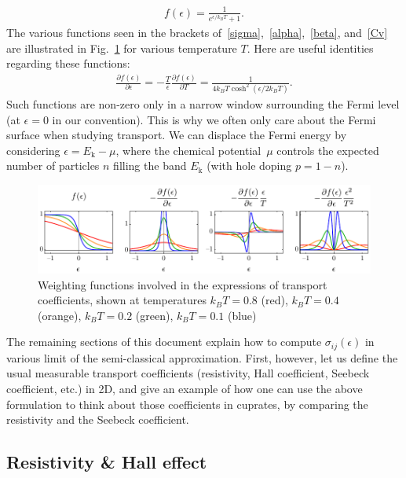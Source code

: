 \documentclass[notitlepage,11pt,nofootinbib]{revtex4-1}
\renewcommand{\vec}[1]{\bm{\mathrm{#1}}}
\begin{document}
\begin{align}
f(\epsilon) = \frac{1}{e^{\epsilon/k_{B}T}+1}.
\end{align}
The various functions seen in the brackets of~\eqref{sigma},~\eqref{alpha},~\eqref{beta}, and~\eqref{Cv} are illustrated in Fig.~\ref{figure_fermi} for various temperature $T$. Here are useful identities regarding these functions:
\begin{align}
\frac{\partial f(\epsilon)}{\partial \epsilon}
= 
-\frac{T}{\epsilon}
\frac{\partial f(\epsilon)}{\partial T} = 
\frac{1}{4k_BT\cosh^{2}(\epsilon/2k_BT)}.
\end{align}
Such functions are non-zero only in a narrow window surrounding the Fermi level (at $\epsilon=0$ in our convention). This is why we often only care about the Fermi surface when studying transport. 
We can displace the Fermi energy by considering $\epsilon = E_{\vec k}-\mu$, where the chemical potential~$\mu$ controls the expected number of particles $n$ filling the band $E_{\vec k}$ (with hole doping $p=1-n$).

\begin{figure}
\centering
\includegraphics[width=\textwidth]{fermi.pdf}
\caption{Weighting functions involved in the expressions of transport coefficients, shown at temperatures $k_BT=0.8$ (red), $k_BT=0.4$ (orange), $k_BT=0.2$ (green), $k_BT=0.1$ (blue)}
\label{figure_fermi}
\end{figure}

The remaining sections of this document explain how to compute $\sigma_{ij}(\epsilon)$ in various limit of the semi-classical approximation. 
First, however, let us define the usual measurable transport coefficients (resistivity, Hall coefficient, Seebeck coefficient, etc.) in 2D, and give an example of how one can use the above formulation to think about those coefficients in cuprates, by comparing the resistivity and the Seebeck coefficient.

\subsection{Resistivity \& Hall effect}
\end{document}
